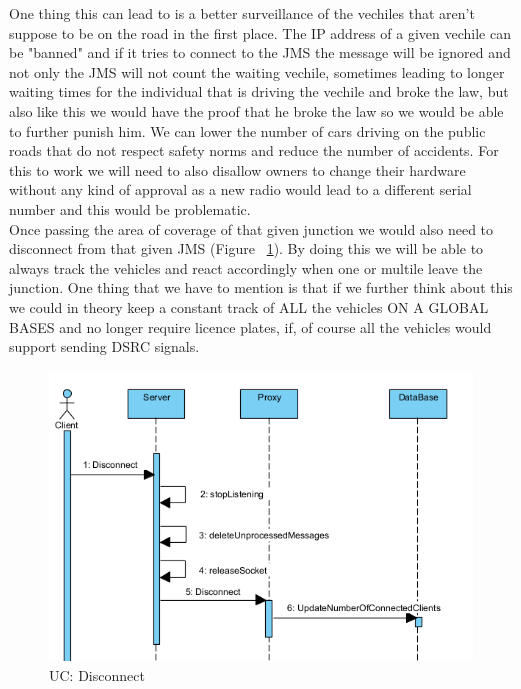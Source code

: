 \documentclass[17pt]{report}
\begin{document}
\pagebreak

One thing this can lead to is a 
better surveillance of the vechiles that aren't suppose to be on the 
road in the first place. The IP address of a given vechile can be "banned"
and if it tries to connect to the JMS the message will be ignored
and not only the JMS will not count the waiting vechile, sometimes 
leading to longer waiting times for the individual that is driving the
vechile and broke the law, but also like this we would have the proof
that he broke the law so we would be able to further punish him. We can lower the number of cars driving on the public
roads that do not respect safety norms and reduce the number of
accidents. For this to work we will need to also disallow owners to 
change their hardware without any kind of approval as a new radio
would lead to a different serial number and this would be problematic.\\
\indent \indent 
Once passing the area of coverage of that given junction we would also need
to disconnect from that given JMS (Figure ~\ref{fig:UC_Disconnect}). By doing 
this we will be able to always track the vehicles and react accordingly when
one or multile leave the junction. One thing that we have to mention is that if
we further think about this we could in theory keep a constant track of ALL
the vehicles ON A GLOBAL BASES and no longer require licence plates, if, of 
course all the vehicles would support sending DSRC signals.  

\begin{figure}[h!]
    \includegraphics[width=\textwidth]{UC/Disconnect.png}
    \caption{UC: Disconnect}
    \label{fig:UC_Disconnect}
\end{figure}
\end{document}
